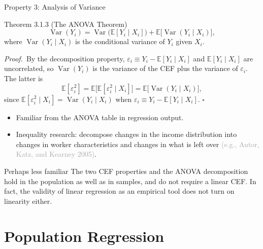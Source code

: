 \documentclass[aspectratio=169,11pt]{beamer}
\newcommand{\E}{\mathbb{E}}
\newcommand{\Var}{\operatorname{Var}}
\newcommand{\PrfLbl}{\textcolor{DeepBlue}{\textit{Proof.}}\ }
\newcommand{\QED}{\hfill$\square$}
\newcommand{\Src}[1]{{\scriptsize\textcolor{DarkGray}{#1}}}
\begin{document}
\begin{frame}{Property 3: Analysis of Variance}
\small

\begin{block}{Theorem 3.1.3 (The ANOVA Theorem)}
\[
\Var(Y_i) = \Var\big(\E[Y_i\mid X_i]\big) + \E\big[\Var(Y_i\mid X_i)\big],
\]
where $\Var(Y_i\mid X_i)$ is the conditional variance of $Y_i$ given $X_i$.
\end{block}

\PrfLbl By the decomposition property, $\varepsilon_i\equiv Y_i-\E[Y_i\mid X_i]$
and $\E[Y_i\mid X_i]$ are uncorrelated, so $\Var(Y_i)$ is the variance of the
CEF plus the variance of $\varepsilon_i$. The latter is
\[
\E[\varepsilon_i^2] = \E\big[\E[\varepsilon_i^2\mid X_i]\big]
= \E\big[\Var(Y_i\mid X_i)\big],
\]
since $\E[\varepsilon_i^2\mid X_i]=\Var(Y_i\mid X_i)$ when
$\varepsilon_i\equiv Y_i-\E[Y_i\mid X_i]$. \QED

\medskip

\begin{itemize}
    \item Familiar from the ANOVA table in regression output.
    \item Inequality research: decompose changes in the income distribution
    into changes in worker characteristics and changes in what is left over
    \Src{(e.g., Autor, Katz, and Kearney 2005)}.
\end{itemize}

\begin{alertblock}{Perhaps less familiar}
The two CEF properties and the ANOVA decomposition hold in the population as
well as in samples, and do \alert{not} require a linear CEF. In fact, the
validity of linear regression as an empirical tool does not turn on
linearity either.
\end{alertblock}

\end{frame}



\section{Population Regression}
\end{document}
